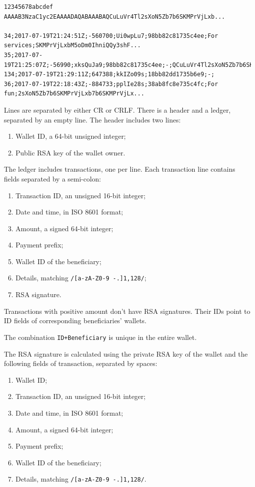 \documentclass[11pt,oneside]{article}
\newcommand\dd[1]{\colorbox{gray!30}{\texttt{#1}}}
\begin{document}
\begin{verbatim}
12345678abcdef
AAAAB3NzaC1yc2EAAAADAQABAAABAQCuLuVr4Tl2sXoN5Zb7b6SKMPrVjLxb...

34;2017-07-19T21:24:51Z;-560700;Ui0wpLu7;98bb82c81735c4ee;For services;SKMPrVjLxbM5oDm0IhniQQy3shF...
35;2017-07-19T21:25:07Z;-56990;xksQuJa9;98bb82c81735c4ee;-;QCuLuVr4Tl2sXoN5Zb7b6SKMPrVjLxb...
134;2017-07-19T21:29:11Z;647388;kkIZo09s;18bb82dd1735b6e9;-;
36;2017-07-19T22:18:43Z;-884733;pplIe28s;38ab8fc8e735c4fc;For fun;2sXoN5Zb7b6SKMPrVjLxb7b6SKMPrVjLx...
\end{verbatim}

Lines are separated by either CR or CRLF.
There is a header and a ledger, separated by an empty line.
The header includes two lines:

\begin{enumerate}
  \item Wallet ID, a 64-bit unsigned integer;
  \item Public RSA key of the wallet owner.
\end{enumerate}

The ledger includes transactions, one per line. Each transaction line
contains fields separated by a semi-colon:

\begin{enumerate}
  \item Transaction ID, an unsigned 16-bit integer;
  \item Date and time, in ISO 8601 format;
  \item Amount, a signed 64-bit integer;
  \item Payment prefix;
  \item Wallet ID of the beneficiary;
  \item Details, matching \dd{/[a-zA-Z0-9 -.]{1,128}/};
  \item RSA signature.
\end{enumerate}

Transactions with positive amount don't have RSA signatures.
Their IDs point to ID fields of corresponding beneficiaries' wallets.

The combination \dd{ID+Beneficiary} is unique in the entire wallet.

The RSA signature is calculated using the private RSA key of the
wallet and the following fields of transaction, separated by spaces:

\begin{enumerate}
  \item Wallet ID;
  \item Transaction ID, an unsigned 16-bit integer;
  \item Date and time, in ISO 8601 format;
  \item Amount, a signed 64-bit integer;
  \item Payment prefix;
  \item Wallet ID of the beneficiary;
  \item Details, matching \dd{/[a-zA-Z0-9 -.]{1,128}/}.
\end{enumerate}
\end{document}
